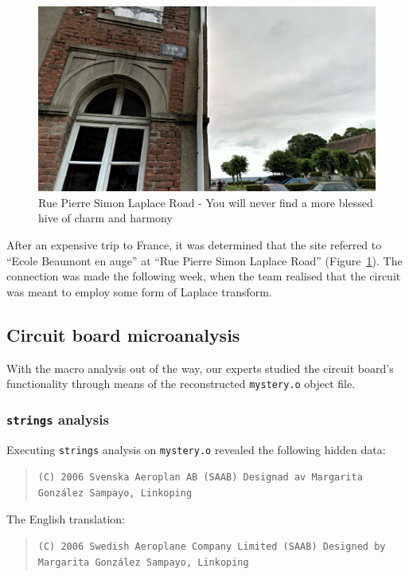 \begin{figure}[h]
    \centering
    \includegraphics[width=0.95\columnwidth]{img/laplace-road.png}
    \caption{Rue Pierre Simon Laplace Road - You will never find a more blessed hive of charm and harmony}
    \label{fig:laplace-road}
\end{figure}


After an expensive trip to France, it was determined that the site referred to ``Ecole Beaumont en auge'' at ``Rue Pierre Simon Laplace Road'' (Figure~\ref{fig:laplace-road}). The connection was made the following week, when the team realised that the circuit was meant to employ some form of Laplace transform.


\subsection{Circuit board microanalysis}

With the macro analysis out of the way, our experts studied the circuit board's functionality through means of the reconstructed \texttt{mystery.o} object file.



\subsubsection{\texttt{strings} analysis}
Executing \texttt{strings} analysis on \texttt{mystery.o} revealed the following hidden data:

\begin{quote}
\texttt{(C) 2006 Svenska Aeroplan AB (SAAB) Designad av Margarita Gonz\'{a}lez Sampayo, Linkoping}
\end{quote}

The English translation:
\begin{quote}
\texttt{(C) 2006 Swedish Aeroplane Company Limited (SAAB) Designed by Margarita Gonz\'{a}lez Sampayo, Linkoping}
\end{quote}


